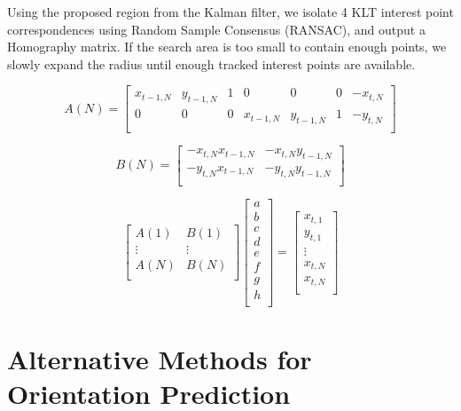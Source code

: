 \documentclass[letterpaper,10pt,conference]{IEEEtran}
\begin{document}
Using the proposed region from the Kalman filter, we isolate 4 KLT interest point correspondences using Random Sample Consensus (RANSAC), and output a Homography matrix. If the search area is too small to contain enough points, we slowly expand the radius until enough tracked interest points are available.

\begin{equation}
A(N) = 
\begin{bmatrix}
x_{t-1,N}& y_{t-1,N}&1&0&0&0& -x_{t,N}\\
0&0&0&x_{t-1,N}& y_{t-1,N}&1& -y_{t,N}\\
\end{bmatrix}
\end{equation}

\begin{equation}
B(N) = 
\begin{bmatrix}
-x_{t,N}x_{t-1,N}& -x_{t,N}y_{t-1,N}\\
-y_{t,N}x_{t-1,N} &-y_{t,N}y_{t-1,N}\\
\end{bmatrix}
\end{equation}


\begin{equation}
\begin{bmatrix}
A(1)& B(1)\\
\vdots&\vdots\\
A(N)& B(N) \\
\end{bmatrix}
\begin{bmatrix}
a\\
b\\
c\\
d\\
e\\
f\\
g\\
h\\
\end{bmatrix} = 
\begin{bmatrix}
x_{t,1}\\
y_{t,1}\\
\vdots\\
x_{t,N}\\
x_{t,N}\\
\end{bmatrix}
\end{equation}

\section{Alternative Methods for Orientation Prediction}
\end{document}

